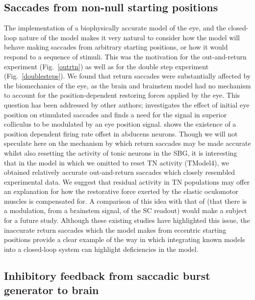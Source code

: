 \documentclass{frontiersSCNS}
\begin{document}
\subsection{Saccades from non-null starting positions}

The implementation of a biophysically accurate model of the eye, and
the closed-loop nature of the model makes it very natural to consider
how the model will behave making saccades from arbitrary starting
positions, or how it would respond to a sequence of stimuli. This was
the motivation for the out-and-return experiment (Fig.~\ref{outrtn})
as well as for the double step experiment (Fig.~\ref{doublesteps}).
We found that return saccades were substantially affected by the
biomechanics of the eye, as the brain and brainstem model had no
mechanism to account for the position-dependent restoring forces
applied by the eye. This question has been addressed by other authors;
\cite{groh_effects_2011} investigates the effect of
initial eye position on stimulated saccades and finds a need for the
signal in superior colliculus to be modulated by an eye position
signal. \cite{ling_effects_2007} shows the existence of a position
dependent firing rate offset in abducens neurons. Though we will not
speculate here on the mechanism by which return saccades may be made
accurate whilst also resetting the activity of tonic neurons in the
SBG, it is interesting that in the model in which we omitted to reset
TN activity (TModel4), we obtained relatively accurate out-and-return
saccades which closely resembled experimental data.  We suggest that
residual activity in TN populations may offer an explanation for how
the restorative force exerted by the elastic oculomotor muscles is
compensated for. A comparison of this idea with that
of \cite{groh_effects_2011} (that there is a modulation, from a
brainstem signal, of the SC readout) would make a subject for a future
study. Although these existing studies have highlighted this issue,
the inaccurate return saccades which the model makes from eccentric
starting positions provide a clear example of the way in which
integrating known models into a closed-loop system can highlight
deficiencies in the model.

\subsection{Inhibitory feedback from saccadic burst generator to brain}
\end{document}
